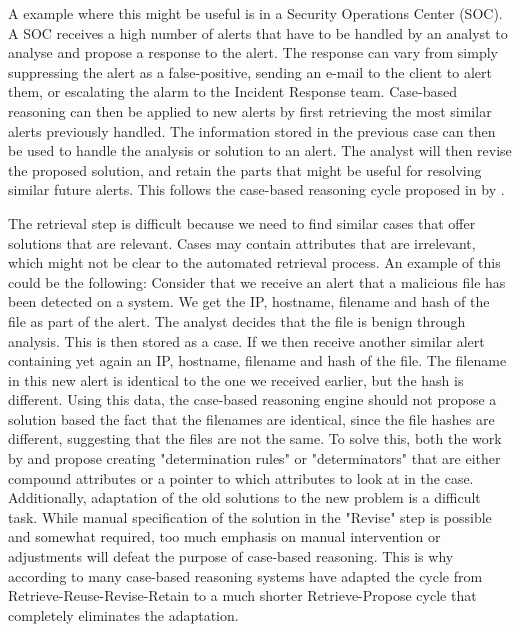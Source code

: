 A example where this might be useful is in a Security Operations Center (SOC). A SOC receives a high number of alerts that have to be handled by an analyst to analyse and propose a response to the alert. The response can vary from simply suppressing the alert as a false-positive, sending an e-mail to the client to alert them, or escalating the alarm to the Incident Response team. Case-based reasoning can then be applied to new alerts by first retrieving the most similar alerts previously handled. The information stored in the previous case can then be used to handle the analysis or solution to an alert. The analyst will then revise the proposed solution, and retain the parts that might be useful for resolving similar future alerts. This follows the case-based reasoning cycle proposed in  by \textcite{aamodt_1994}.

The retrieval step is difficult because we need to find similar cases that offer solutions that are relevant. Cases may contain attributes that are irrelevant, which might not be clear to the automated retrieval process.
An example of this could be the following: Consider that we receive an alert that a malicious file has been detected on a system. We get the IP, hostname, filename and hash of the file as part of the alert. The analyst decides that the file is benign through analysis. This is then stored as a case. If we then receive another similar alert containing yet again an IP, hostname, filename and hash of the file. The filename in this new alert is identical to the one we received earlier, but the hash is different. Using this data, the case-based reasoning engine should not propose a solution based the fact that the filenames are identical, since the file hashes are different, suggesting that the files are not the same.
To solve this, both the work by \textcite{lewis_1993} and \textcite{davies_1987} propose creating "determination rules" or "determinators" that are either compound attributes or a pointer to which attributes to look at in the case.
Additionally, adaptation of the old solutions to the new problem is a difficult task. While manual specification of the solution in the "Revise" step is possible and somewhat required, too much emphasis on manual intervention or adjustments will defeat the purpose of case-based reasoning. This is why according to \textcite{leake_1996} many case-based reasoning systems have adapted the cycle from Retrieve-Reuse-Revise-Retain to a much shorter Retrieve-Propose cycle that completely eliminates the adaptation.

